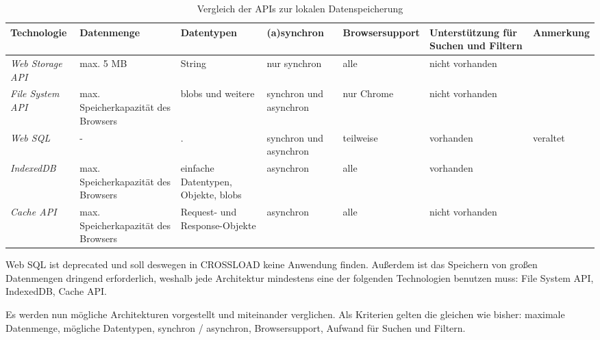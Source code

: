 \begin{sidewaystable}[h]
  \renewcommand{\arraystretch}{1.2}
  \centering
  \sffamily
  \begin{footnotesize}
    \begin{tabularx}{1.0\textwidth}{l L L L l l L}
      \toprule
      \textbf{Technologie} & \textbf{Datenmenge} & \textbf{Datentypen} & \textbf{(a)synchron} & \textbf{Browsersupport} & \textbf{Unterstützung für Suchen und Filtern} & \textbf{Anmerkung} \\
      \midrule
      \emph{Web Storage \ac{API}} & max. 5 \ac{MB} & String & nur synchron & alle & nicht vorhanden & \\
      \emph{File System \ac{API}} & max. Speicherkapazität des Browsers & \acp{blob} und weitere & synchron und asynchron & nur Chrome & nicht vorhanden &  \\
      \emph{Web SQL} & - & . & synchron und asynchron & teilweise & vorhanden & veraltet \\
      \emph{IndexedDB} & max. Speicherkapazität des Browsers & einfache Datentypen, Objekte, \acp{blob} & asynchron & alle & vorhanden & \\
      \emph{Cache \ac{API}} & max. Speicherkapazität des Browsers & Request- und Response-Objekte & asynchron & alle & nicht vorhanden & \\
      \bottomrule
    \end{tabularx}
  \end{footnotesize}
  \rmfamily
  \caption{Vergleich der APIs zur lokalen Datenspeicherung}
  \label{Kap4:Datenspeicherung}
\end{sidewaystable}

\clearpage

Web SQL ist deprecated und soll deswegen in CROSSLOAD keine Anwendung finden. Außerdem ist das Speichern von großen Datenmengen dringend erforderlich, weshalb jede Architektur mindestens eine der folgenden Technologien benutzen muss: File System \ac{API}, IndexedDB, Cache \ac{API}.

Es werden nun mögliche Architekturen vorgestellt und miteinander verglichen. Als Kriterien gelten die gleichen wie bisher: maximale Datenmenge, mögliche Datentypen, synchron / asynchron, Browsersupport, Aufwand für Suchen und Filtern.

